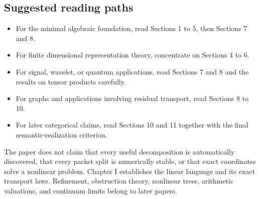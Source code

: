 \subsection*{Suggested reading paths}
\begin{itemize}
\item For the minimal algebraic foundation, read Sections 1 to 5, then Sections 7 and 8.
\item For finite dimensional representation theory, concentrate on Sections 4 to 6.
\item For signal, wavelet, or quantum applications, read Sections 7 and 8 and the results on tensor products carefully.
\item For graphs and applications involving residual transport, read Sections 8 to 10.
\item For later categorical claims, read Sections 10 and 11 together with the final semantic-realization criterion.
\end{itemize}

\begin{warningbox}
The paper does not claim that every useful decomposition is automatically discovered, that every packet split is numerically stable, or that exact coordinates solve a nonlinear problem.  Chapter I establishes the linear language and its exact transport laws.  Refinement, obstruction theory, nonlinear trees, arithmetic valuations, and continuum limits belong to later papers.
\end{warningbox}

